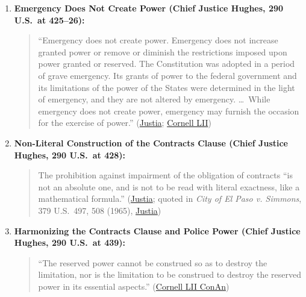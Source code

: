 \documentclass[12pt]{article}
\begin{document}
\begin{enumerate}
  \item \textbf{Emergency Does Not Create Power (Chief Justice Hughes, 290 U.S.\ at 425--26):}
  \begin{quote}
    ``Emergency does not create power. Emergency does not increase granted power or remove or diminish the restrictions imposed upon power granted or reserved. The Constitution was adopted in a period of grave emergency. Its grants of power to the federal government and its limitations of the power of the States were determined in the light of emergency, and they are not altered by emergency. \ldots\ While emergency does not create power, emergency may furnish the occasion for the exercise of power.'' (\href{https://supreme.justia.com/cases/federal/us/290/398/}{Justia}; \href{https://www.law.cornell.edu/supremecourt/text/290/398}{Cornell LII})
  \end{quote}

  \item \textbf{Non-Literal Construction of the Contracts Clause (Chief Justice Hughes, 290 U.S.\ at 428):}
  \begin{quote}
    The prohibition against impairment of the obligation of contracts ``is not an absolute one, and is not to be read with literal exactness, like a mathematical formula.'' (\href{https://supreme.justia.com/cases/federal/us/290/398/}{Justia}; quoted in \emph{City of El Paso v. Simmons}, 379 U.S.\ 497, 508 (1965), \href{https://supreme.justia.com/cases/federal/us/379/497/}{Justia})
  \end{quote}

  \item \textbf{Harmonizing the Contracts Clause and Police Power (Chief Justice Hughes, 290 U.S.\ at 439):}
  \begin{quote}
    ``The reserved power cannot be construed so as to destroy the limitation, nor is the limitation to be construed to destroy the reserved power in its essential aspects.'' (\href{https://www.law.cornell.edu/constitution-conan/article-1/section-10/clause-1/blaisdell-case-and-state-modifications-to-private-contracts}{Cornell LII ConAn})
  \end{quote}


\end{enumerate}
\end{document}
